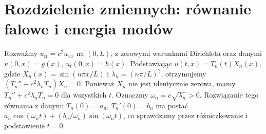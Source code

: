 \section{Rozdzielenie zmiennych: równanie falowe i energia modów}
\label{sec:pde6-wave}

Rozważmy $u_{tt}=c^2u_{xx}$ na $(0,L)$,
z zerowymi warunkami Dirichleta oraz danymi
$u(0,x)=g(x)$, $u_t(0,x)=h(x)$.
Podstawiając $u(t,x)=T_n(t)X_n(x)$, gdzie
$X_n(x)=\sin(n\pi x/L)$ i $\lambda_n=(n\pi/L)^2$,
otrzymujemy $(T_n''+c^2\lambda_nT_n)X_n=0$.
Ponieważ $X_n$ nie jest identycznie zerowa, mamy
$T_n''+c^2\lambda_nT_n=0$ dla wszystkich $t$.
Oznaczmy $\omega_n=c\sqrt{\lambda_n}>0$. Rozwiązanie
tego równania z danymi $T_n(0)=a_n$, $T_n'(0)=b_n$
ma postać $a_n\cos(\omega_nt)+(b_n/\omega_n)\sin(\omega_nt)$,
co sprawdzamy przez różniczkowanie i podstawienie $t=0$.

